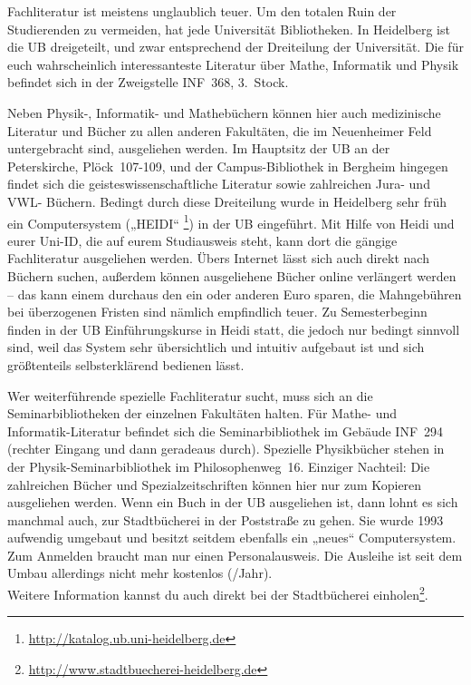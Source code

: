 Fachliteratur ist meistens unglaublich teuer. Um den totalen Ruin  der Studierenden zu vermeiden,
hat jede Universität Bibliotheken.  In Heidelberg ist die \gls{UB} dreigeteilt, und zwar
entsprechend  der Dreiteilung der Universität. Die für euch wahrscheinlich  interessanteste
Literatur über Mathe, Informatik und Physik befindet sich in  der Zweigstelle \gls{INF}~368, 3.~Stock.

Neben Physik-, Informatik-  und Mathebüchern können hier auch medizinische Literatur und Bücher zu allen anderen
Fakultäten, die im Neuenheimer Feld untergebracht sind, ausgeliehen werden. Im Hauptsitz der
\gls{UB} an der Peterskirche, Plöck~107-109, und der Campus-Bibliothek in Bergheim hingegen findet
sich die geisteswissenschaftliche Literatur sowie zahlreichen Jura- und VWL- Büchern. Bedingt durch
diese Dreiteilung wurde in Heidelberg sehr früh ein Computersystem („\gls{HEIDI}“
\footnote{\url{http://katalog.ub.uni-heidelberg.de}}) in der UB eingeführt. Mit Hilfe von Heidi und
eurer Uni-ID, die auf eurem Studiausweis steht, kann dort die gängige Fachliteratur ausgeliehen werden.
Übers Internet lässt sich auch direkt nach Büchern suchen, außerdem können ausgeliehene Bücher
online verlängert werden -- das kann einem durchaus den ein oder anderen Euro sparen, die
Mahngebühren bei überzogenen Fristen sind nämlich empfindlich teuer. Zu Semesterbeginn finden in der
UB Einführungskurse in Heidi statt, die jedoch nur bedingt sinnvoll sind, weil das System sehr
übersichtlich und intuitiv aufgebaut ist und sich größtenteils selbsterklärend bedienen lässt.

Wer weiterführende spezielle Fachliteratur sucht, muss sich an die Seminarbibliotheken der
einzelnen Fakultäten halten. Für Mathe- und Informatik-Literatur befindet sich die Seminarbibliothek
im Gebäude \gls{INF}~294 (rechter Eingang und dann geradeaus durch). Spezielle Physikbücher stehen
in der Physik-Seminarbibliothek im Philosophenweg~16. Einziger Nachteil: Die zahlreichen Bücher und
Spezialzeitschriften können hier nur zum Kopieren ausgeliehen werden. Wenn ein Buch in der UB
ausgeliehen ist, dann lohnt es sich manchmal auch, zur Stadtbücherei in der Poststraße zu gehen. Sie
wurde 1993 aufwendig umgebaut und besitzt seitdem ebenfalls ein „neues“ Computersystem. Zum Anmelden
braucht man nur einen Personalausweis. Die Ausleihe ist seit dem Umbau allerdings nicht mehr
kostenlos (/Jahr).\\ Weitere Information kannst du auch direkt bei der Stadtbücherei
einholen\footnote{\url{http://www.stadtbuecherei-heidelberg.de}}.

